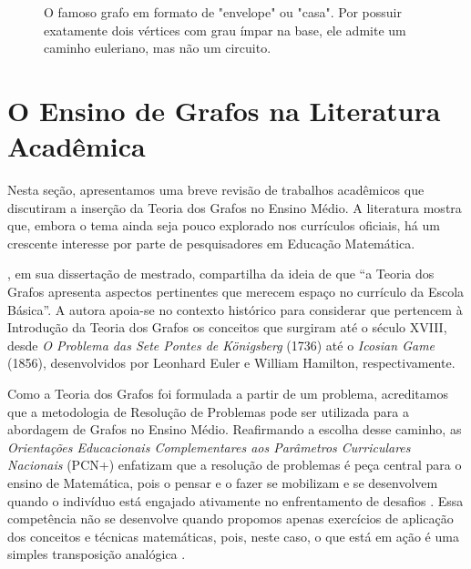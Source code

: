 \documentclass[
  12pt,
  oneside,
  a4paper,
  english,
  brazilian
  ]{abntex2}
\theoremstyle{definition}
\begin{document}
\begin{figure}[htbp]
    \centering
    \caption{O famoso grafo em formato de "envelope" ou "casa". Por possuir exatamente dois vértices com grau ímpar na base, ele admite um caminho euleriano, mas não um circuito.}
    \label{fig:euleriano}
\end{figure}

\section{O Ensino de Grafos na Literatura Acadêmica}

Nesta seção, apresentamos uma breve revisão de trabalhos acadêmicos que discutiram a inserção da Teoria dos Grafos no Ensino Médio. A literatura mostra que, embora o tema ainda seja pouco explorado nos currículos oficiais, há um crescente interesse por parte de pesquisadores em Educação Matemática.

, em sua dissertação de mestrado, compartilha da ideia de que ``a Teoria dos Grafos apresenta aspectos pertinentes que merecem espaço no currículo da Escola Básica''. A autora apoia-se no contexto histórico para considerar que pertencem à Introdução da Teoria dos Grafos os conceitos que surgiram até o século XVIII, desde \textit{O Problema das Sete Pontes de Königsberg} (1736) até o \textit{Icosian Game} (1856), desenvolvidos por Leonhard Euler e William Hamilton, respectivamente.

Como a Teoria dos Grafos foi formulada a partir de um problema, acreditamos que a metodologia de Resolução de Problemas pode ser utilizada para a abordagem de Grafos no Ensino Médio. Reafirmando a escolha desse caminho, as \textit{Orientações Educacionais Complementares aos Parâmetros Curriculares Nacionais} (PCN+) enfatizam que a resolução de problemas é peça central para o ensino de Matemática, pois o pensar e o fazer se mobilizam e se desenvolvem quando o indivíduo está engajado ativamente no enfrentamento de desafios \cite{brasil2002}. Essa competência não se desenvolve quando propomos apenas exercícios de aplicação dos conceitos e técnicas matemáticas, pois, neste caso, o que está em ação é uma simples transposição analógica \cite{brasil2002}.
\end{document}
